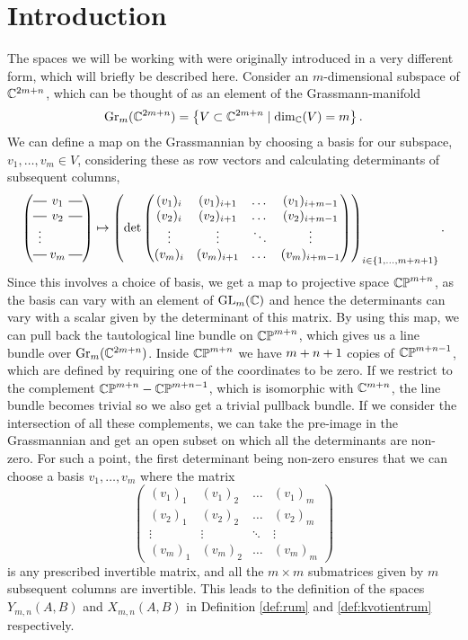 \chapter{Introduction}
\label{chap:introduktion}

The spaces we will be working with were originally introduced
in a very different form, which will briefly be described here.
Consider an $m$-dimensional subspace of $\mathbb{C}^{{2m+n}}$, which can be
thought of as an element of the Grassmann-manifold
\[ \mathrm{Gr}_m(\mathbb{C}^{{2m+n}}) = \left\{ V \subset \mathbb{C}^{{2m+n}} \mid
  \dim_{\mathbb{C}}(V) = m \right\}. \]
We can define a map on the Grassmannian by
choosing a basis for our subspace, $v_1,\dots,v_m \in V$, considering
these as row vectors and calculating determinants of subsequent
columns,
\[
\begin{pmatrix}
  \matrow{v_1} \\
  \matrow{v_2} \\
  \vdots \\
  \matrow{v_m} 
\end{pmatrix} \mapsto \left(\det
  \begin{pmatrix}
    (v_1)_i & (v_1)_{i+1} & \dots  & (v_1)_{i+m-1} \\
    (v_2)_i & (v_2)_{i+1} & \dots  & (v_2)_{i+m-1} \\
    \vdots  & \vdots    & \ddots & \vdots       \\
    (v_m)_i & (v_m)_{i+1} & \dots  & (v_m)_{i+m-1}
  \end{pmatrix}
\right)_{i \in \set{1,\dots,m+n+1}}. \]
Since this involves a choice of basis, we get a map to
projective space $\mathbb{CP}^{{m+n}}$, as the basis can vary with an element of
$\operatorname{GL}_m(\mathbb{C})$ and
hence the determinants can vary with a scalar given
by the determinant of this matrix. By using this map, we can pull back
the tautological line bundle on $\mathbb{CP}^{m+n}$, which gives us a line
bundle over $\mathrm{Gr}_m(\mathbb{C}^{{2m+n}})$. Inside $\mathbb{CP}^{m+n}$ we have ${m+n}+1$ copies of
$\mathbb{CP}^{{m+n-1}}$, which are defined by requiring one of the coordinates
to be zero. If we restrict to the complement $\mathbb{CP}^{m+n}-\mathbb{CP}^{m+n-1}$,
which is
isomorphic with $\mathbb{C}^{{m+n}}$, the line bundle becomes
trivial so we also get a trivial pullback bundle. If we consider the
intersection of all these complements, we can take the pre-image in
the Grassmannian and get an open subset on which all the determinants
are non-zero. For such a
point, the first determinant being non-zero ensures that we can
choose a basis $v_1,\dots,v_m$ where the matrix
\[ \begin{pmatrix}
  (v_1)_1 & (v_1)_{2} & \dots  & (v_1)_{m} \\
  (v_2)_1 & (v_2)_{2} & \dots  & (v_2)_{m} \\
  \vdots  & \vdots   & \ddots & \vdots   \\
  (v_m)_1 & (v_m)_{2} & \dots  & (v_m)_{m}
\end{pmatrix} \]
is any prescribed invertible matrix, and all the $m\times m$
submatrices given by $m$ subsequent columns are invertible. This leads
to the definition of the spaces $Y_{m,n}(A,B)$ and $X_{m,n}(A,B)$
in Definition \ref{def:rum} and \ref{def:kvotientrum} respectively.


